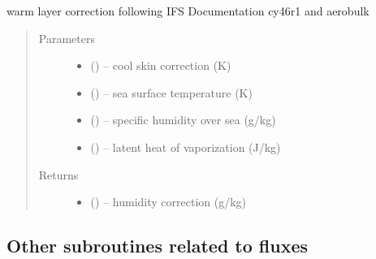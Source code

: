 \documentclass[letterpaper,10pt,english]{sphinxmanual}
\begin{document}
\begin{fulllineitems}
\label{\detokenize{index:cs_wl_subs.get_dqer}}
warm layer correction following IFS Documentation cy46r1 \citep{era5_2019} and aerobulk \citep{Brodeau_etal_2017} 
\begin{quote}\begin{description}
\item[{Parameters}] \leavevmode\begin{itemize}
\item {} 
 (\href{https://docs.python.org/3/library/functions.html\#float}{}) -- cool skin correction (K)

\item {} 
 (\href{https://docs.python.org/3/library/functions.html\#float}{}) -- sea surface temperature (K)

\item {} 
 (\href{https://docs.python.org/3/library/functions.html\#float}{}) -- specific humidity over sea (g/kg)

\item {} 
 (\href{https://docs.python.org/3/library/functions.html\#float}{}) -- latent heat of vaporization (J/kg)
\end{itemize}

\item[{Returns}] \leavevmode
\begin{itemize}
\item {} 
 (\href{https://docs.python.org/3/library/functions.html\#float}{}) -- humidity correction (g/kg)

\end{itemize}

\end{description}\end{quote}
\end{fulllineitems}

%
%
\subsection{Other subroutines related to fluxes}
\label{\detokenize{index:other-subroutines-related-to-fluxes}}
\end{document}
